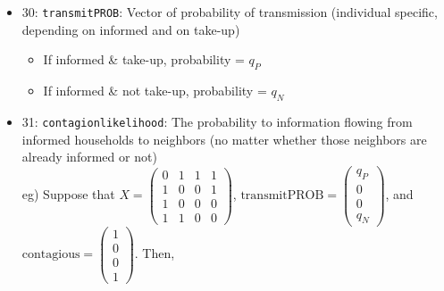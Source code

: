 \documentclass[10pt,letterpaper]{article}
\begin{document}
\begin{itemize}
\begin{itemize}
        \begin{itemize}
          \item 30: \texttt{transmitPROB}: Vector of probability of transmission (individual specific, depending on informed and on take-up)
            \begin{itemize}
              \item If informed \& take-up, probability = $q_P$
              \item If informed \& not take-up, probability = $q_N$
            \end{itemize}
          \item 31: \texttt{contagionlikelihood}: The probability to information flowing from informed households to neighbors (no matter whether those neighbors are already informed or not) \\
            eg) Suppose that
            $X = \begin{pmatrix}
              0 & 1 & 1 & 1 \\
              1 & 0 & 0 & 1 \\
              1 & 0 & 0 & 0 \\
              1 & 1 & 0 & 0
            \end{pmatrix}$,
            $\text{transmitPROB} = \begin{pmatrix} q_P \\ 0 \\ 0 \\ q_N \end{pmatrix}$,
            and $\text{contagious} = \begin{pmatrix} 1 \\ 0 \\ 0 \\ 1 \end{pmatrix}$.
            Then, 


\end{itemize}
\end{itemize}
\end{itemize}
\end{document}
